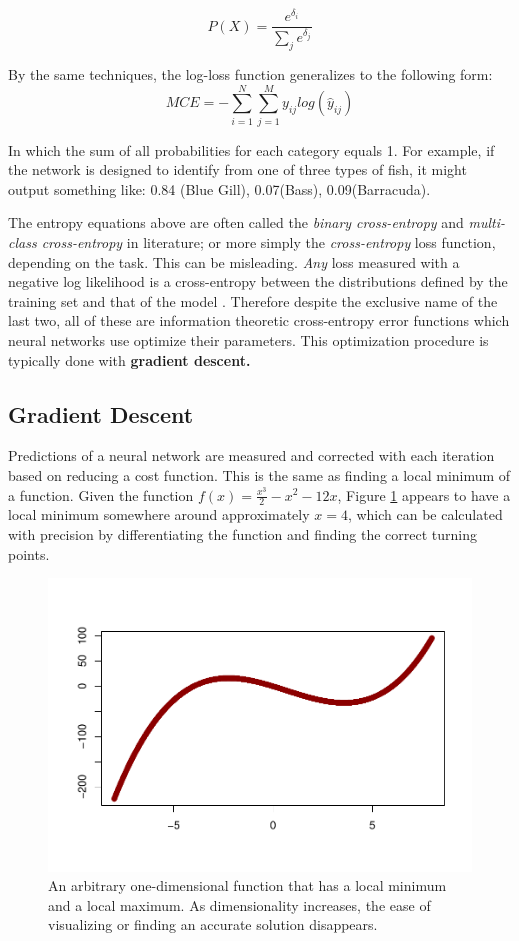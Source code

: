 $$
P(X) = \frac{e^{\delta_i}}{\sum_j{e^{\delta_j} }}
$$

By the same techniques, the log-loss function generalizes to the following form:
$$
MCE = -\sum_{i=1}^N \sum_{j=1}^M y_{ij} log (\hat{y}_{ij})
$$

In which the sum of all probabilities for each category equals 1.  For example, if the network is designed to identify from one of three types of fish, it might output something like:
0.84 (Blue Gill), 0.07(Bass), 0.09(Barracuda).

The entropy equations above are often called the \textit{binary cross-entropy} and \textit{multi-class cross-entropy} in literature; or more simply the \textit{cross-entropy} loss function, depending on the task. This can be misleading.  \textit{Any} loss measured with a negative log likelihood is a cross-entropy between the distributions defined by the training set and that of the model \cite{Goodfellow-et-al-2016}.
Therefore despite the exclusive name of the last two, all of these are information theoretic cross-entropy error functions which neural networks use optimize their parameters.  This optimization procedure is typically done with \textbf{gradient descent.}



\hypertarget{gradient-descent}{%
\subsection{Gradient Descent}\label{gradient-descent}}

Predictions of a neural network are measured and corrected with each
iteration based on reducing a cost function. This is the same as finding
a local minimum of a function.  Given the function \(f(x) = \frac{x^3}{2} - x^2 - 12x\), Figure \ref{red} appears to have a local minimum somewhere around approximately $x = 4$, which can be calculated with precision by differentiating the function and finding the correct turning points.

\begin{figure}[H]
    \centering
    \vspace{-40pt}
    \includegraphics[width = .7\textwidth]{Figures/grad_desc_2D-1.pdf}
    \vspace{-40pt}
    \caption{\footnotesize An arbitrary one-dimensional function that has a local minimum and a local maximum.  As dimensionality increases, the ease of visualizing or finding an accurate solution disappears.}
    \label{red}
\end{figure}

